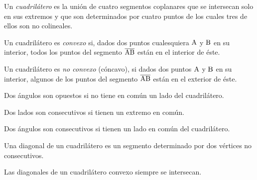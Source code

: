 
\begin{definition}
Un \textit{cuadrilátero} es la unión de cuatro segmentos coplanares que se intersecan solo en sus extremos y que son determinados por cuatro puntos de los cuales tres de ellos son no colineales.
\end{definition}

\begin{definition}
    Un cuadrilátero es \textit{convexo} si, dados dos puntos cualesquiera $\rm A$ y $\rm B$ en su interior, todos los puntos del segmento $\overline{\rm AB}$ están en el interior de éste.
\end{definition}

\begin{definition}
    Un cuadrilátero es \textit{no convexo} (cóncavo), si dados dos puntos $\rm A$ y $\rm B$ en su interior, algunos de los puntos del segmento $\overline{\rm AB}$ están en el exterior de éste.
\end{definition}

\begin{definition}
    Dos ángulos son opuestos si no tiene en común un lado del cuadrilátero.
\end{definition}

\begin{definition}
    Dos lados son consecutivos si tienen un extremo en común.
\end{definition}

\begin{definition}
    Dos ángulos son consecutivos si tienen un lado en común del cuadrilátero.
\end{definition}

\begin{definition}
    Una diagonal de un cuadrilátero es un segmento determinado por dos vértices no consecutivos.
\end{definition}

\begin{theorem}
    Las diagonales de un cuadrilátero convexo siempre se intersecan.

    \begin{figure}[!h]
        \centering
        
        \label{fig:theorem9}
    \end{figure}

\end{theorem}

